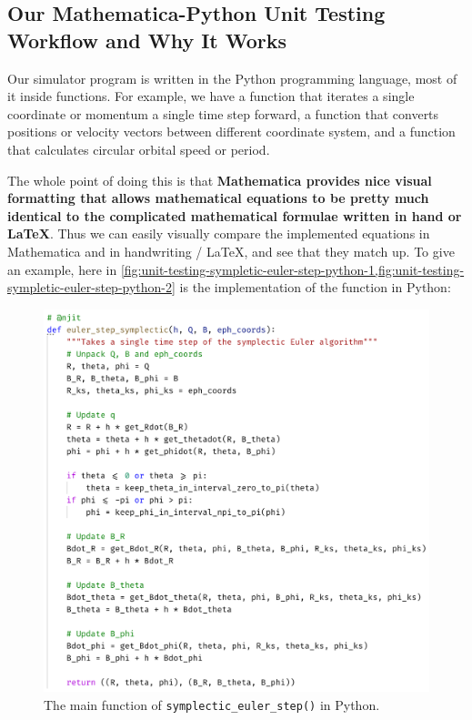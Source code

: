 \subsection{Our Mathematica-Python Unit Testing Workflow and Why It Works}
Our simulator program is written in the Python programming language, most of it inside functions. For example, we have a function that iterates a single coordinate or momentum a single time step forward, a function that converts positions or velocity vectors between different coordinate system, and a function that calculates circular orbital speed or period.

The whole point of doing this is that \textbf{Mathematica provides nice visual formatting that allows mathematical equations to be pretty much identical to the complicated mathematical formulae written in hand or LaTeX}. Thus we can easily visually compare the implemented equations in Mathematica and in handwriting / LaTeX, and see that they match up. To give an example, here in \cref{fig:unit-testing-sympletic-euler-step-python-1,fig:unit-testing-sympletic-euler-step-python-2} is the implementation of the \texttt{} function in Python:

\begin{figure}[H]
    \centering
    \includegraphics[width=0.90\linewidth]{fig/unit-testing-sympletic-euler-step-python-1.png}
    \caption{The main function of \texttt{symplectic\_euler\_step()} in Python.}
    \label{fig:unit-testing-sympletic-euler-step-python-1}
\end{figure}

